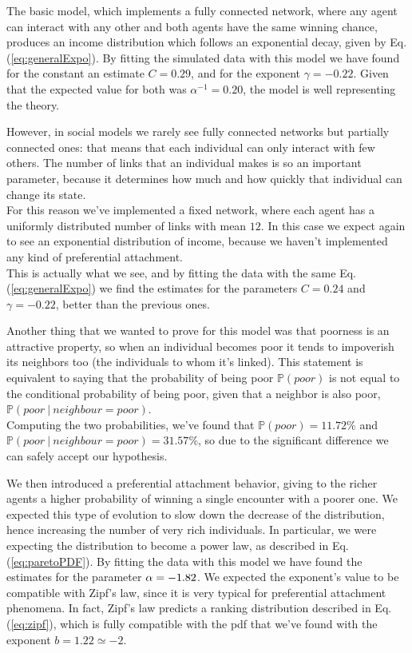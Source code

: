 The basic model, which implements a fully connected network, where any agent can interact with any other and both agents have the same winning chance, produces an income distribution which follows an exponential decay, given by Eq. (\ref{eq:generalExpo}).
By fitting the simulated data with this model we have found for the constant an estimate $C = 0.29$, and for the exponent $\gamma = -0.22$.
Given that the expected value for both was $\alpha^{-1} = 0.20$, the model is well representing the theory.

However, in social models we rarely see fully connected networks but partially connected ones: that means that each individual can only interact with few others.
The number of links that an individual makes is so an important parameter, because it determines how much and how quickly that individual can change its state. \\
For this reason we've implemented a fixed network, where each agent has a uniformly distributed number of links with mean $12$.
In this case we expect again to see an exponential distribution of income, because we haven't implemented any kind of preferential attachment. \\
This is actually what we see, and by fitting the data with the same Eq. (\ref{eq:generalExpo}) we find the estimates for the parameters $C = 0.24$ and $\gamma = -0.22$, better than the previous ones.

Another thing that we wanted to prove for this model was that poorness is an attractive property, so when an individual becomes poor it tends to impoverish its neighbors too (the individuals to whom it's linked).
This statement is equivalent to saying that the probability of being poor $\mathbb{P}(poor)$ is not equal to the conditional probability of being poor, given that a neighbor is also poor, $\mathbb{P}(poor \ | \ neighbour=poor)$. \\
Computing the two probabilities, we've found that $\mathbb{P}(poor) = 11.72 \%$ and \\ $\mathbb{P}(poor \ | \ neighbour=poor) = 31.57 \%$, so due to the significant difference we can safely accept our hypothesis.

We then introduced a preferential attachment behavior, giving to the richer agents a higher probability of winning a single encounter with a poorer one.
We expected this type of evolution to slow down the decrease of the distribution, hence increasing the number of very rich individuals.
In particular, we were expecting the distribution to become a power law, as described in Eq. (\ref{eq:paretoPDF}).
By fitting the data with this model we have found the estimates for the parameter $\alpha = -1.82$.
We expected the exponent's value to be compatible with Zipf's law, since it is very typical for preferential attachment phenomena.
In fact, Zipf's law predicts a ranking distribution described in Eq. (\ref{eq:zipf}), which is fully compatible with the pdf that we've found with the exponent $b = 1.22 \simeq -2$.

